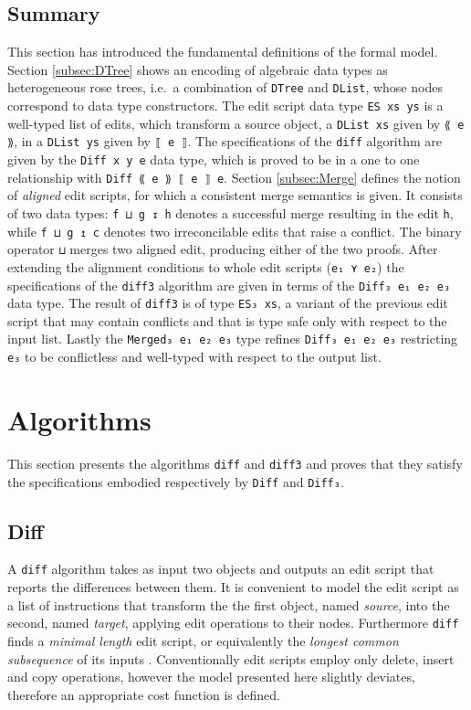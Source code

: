 \documentclass[../Thesis.tex]{subfiles}
\begin{document}
	\subsection{Summary}
	This section has introduced the fundamental definitions
	of the formal model. Section \ref{subsec:DTree} shows an encoding of 	
	algebraic data types as heterogeneous rose trees, i.e.\ a combination of
	\texttt{DTree} and \texttt{DList}, whose nodes correspond
	to data type constructors. The edit script data type \texttt{ES xs ys} is a 
	well-typed list of edits, which 	transform a source object, a \texttt{DList xs} 
	given by \texttt{⟪ e ⟫}, in a \texttt{DList ys} given by \texttt{⟦ e ⟧}.
	The specifications of the \texttt{diff} algorithm are given by the 
	\texttt{Diff x y e} data type, which is proved to be in a one to one 
	relationship with \texttt{Diff ⟪ e ⟫ ⟦ e ⟧ e}.
	Section \ref{subsec:Merge} defines the notion of \emph{aligned} edit 
	scripts, for which a consistent merge semantics	is given. It consists of two
	data types: \texttt{f ⊔ g ↧ h} denotes a successful merge
	resulting in the edit \texttt{h}, while \texttt{f ⊔ g ↥ c} denotes
	two irreconcilable edits that raise a conflict.
	The binary operator \texttt{⊔} merges two aligned edit, producing
	either of the two proofs.
	After extending the alignment conditions to whole edit scripts 
	(\texttt{e₁ ⋎ e₂}) the specifications of the \texttt{diff3} algorithm
	are given in terms of the \texttt{Diff₃ e₁ e₂ e₃} data type.
	The result of \texttt{diff3} is of type \texttt{ES₃ xs},
	a variant of the previous edit script that may contain
	conflicts and that is type safe only with respect to the input list.
	Lastly the \texttt{Merged₃ e₁ e₂ e₃} type refines \texttt{Diff₃ e₁ e₂ e₃}
	restricting \texttt{e₃} to be conflictless and well-typed with respect to the
	output list.
		
\section{Algorithms}
This section presents the algorithms \texttt{diff} and \texttt{diff3} and proves that they satisfy the specifications embodied respectively by \texttt{Diff} and \texttt{Diff₃}.

	\subsection{Diff}
	\label{subsec:AlgoDiff}
	A \texttt{diff} algorithm takes as input two objects 
	and outputs an edit script that reports the differences between them.
	It is convenient to model the edit script as a list of instructions that
	transform the the first object, named \emph{source}, into the second,
	named \emph{target}, applying edit operations to their nodes.
	Furthermore \texttt{diff} finds a \emph{minimal length} edit script, or
	equivalently the \emph{longest common subsequence} of its inputs
	\cite{Berg00, PierceDiff3}.
	Conventionally edit scripts employ only delete, insert and copy operations,
	however the model presented here slightly deviates, therefore an 
	appropriate cost function is defined.
\end{document}
